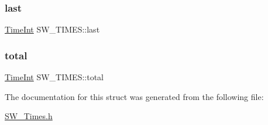\subsubsection{\texorpdfstring{last}{last}}
{\footnotesize\ttfamily \hyperlink{_times_8h_a25ac787161a5cad0e3fdfe5a5aeb3236}{Time\+Int} S\+W\+\_\+\+T\+I\+M\+E\+S\+::last}

\mbox{\label{struct_s_w___t_i_m_e_s_a946437b33df6064e8a2ceaff8d87403e}} 
\subsubsection{\texorpdfstring{total}{total}}
{\footnotesize\ttfamily \hyperlink{_times_8h_a25ac787161a5cad0e3fdfe5a5aeb3236}{Time\+Int} S\+W\+\_\+\+T\+I\+M\+E\+S\+::total}



The documentation for this struct was generated from the following file\+:\begin{DoxyCompactItemize}
\item 
\hyperlink{_s_w___times_8h}{S\+W\+\_\+\+Times.\+h}\end{DoxyCompactItemize}
